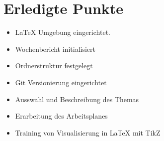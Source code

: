 \section{Erledigte Punkte}

\begin{itemize}
  \item \LaTeX{} Umgebung eingerichtet.
  \item Wochenbericht initialisiert
  \item Ordnerstruktur festgelegt
  \item Git Versionierung eingerichtet
  \item Ausswahl und Beschreibung des Themas
  \item Erarbeitung des Arbeitsplanes
  \item Training von Visualisierung in \LaTeX{} mit TikZ
\end{itemize}

